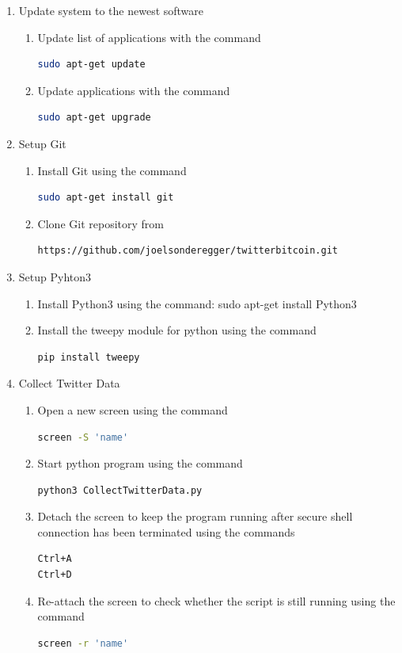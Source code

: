 \documentclass[a4paper,12pt]{article}
\begin{document}
\begin{spacing}{1.2}
\begin{enumerate}
\item Update system to the newest software
\begin{enumerate}
\item Update list of applications with the command
\begin{lstlisting}[language=bash]
sudo apt-get update
\end{lstlisting}
\item Update applications with the command
\begin{lstlisting}[language=bash]
sudo apt-get upgrade
\end{lstlisting}
\end{enumerate}

\item Setup Git
\begin{enumerate}
\item Install Git using the command
\begin{lstlisting}[language=bash]
 sudo apt-get install git
\end{lstlisting}
\item Clone Git repository from
\begin{lstlisting}[language=bash] 
https://github.com/joelsonderegger/twitterbitcoin.git
\end{lstlisting}
\end{enumerate}

\item Setup Pyhton3
\begin{enumerate}
\item Install Python3 using the command: sudo apt-get install Python3 \newline
\item Install the tweepy module for python using the command
\begin{lstlisting}[language=bash]
pip install tweepy
\end{lstlisting}
\end{enumerate}

\item Collect Twitter Data
\begin{enumerate}
\item Open a new screen using the command
\begin{lstlisting}[language=bash] 
screen -S 'name' 
\end{lstlisting}
\item Start python program using the command
\begin{lstlisting}[language=bash]
python3 CollectTwitterData.py
\end{lstlisting}
\item Detach the screen to keep the program running after secure shell connection has been terminated using the commands
\begin{lstlisting}[language=bash]
Ctrl+A
Ctrl+D
\end{lstlisting}
\item Re-attach the screen to check whether the script is still running using the command
\begin{lstlisting}[language=bash]
screen -r 'name'
\end{lstlisting}
\end{enumerate}


\end{enumerate}
\end{spacing}
\end{document}
